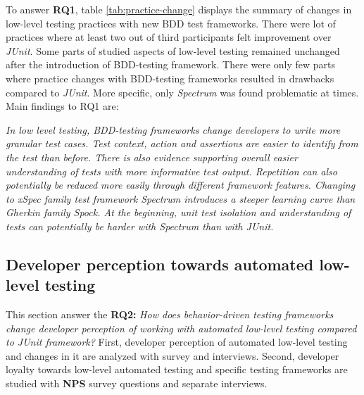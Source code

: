 To answer \textbf{RQ1}, table \ref{tab:practice-change} displays the summary of changes in low-level testing practices with new BDD test
frameworks. There were lot of practices where at least two out of third participants felt improvement over \textit{JUnit}.
Some parts of studied aspects of low-level testing remained unchanged after the introduction of BDD-testing framework.
There were only few parts where practice changes with BDD-testing frameworks resulted in drawbacks compared to \textit{JUnit}. More
specific, only \textit{Spectrum} was found problematic at times. Main findings to RQ1 are:

\vskip 1mm
\begin{topbot}
\textit{In low level testing, BDD-testing frameworks change developers to write more granular test cases. Test
context, action and assertions are easier to identify from the test than before. There is also evidence supporting
overall easier understanding of tests with more informative test output. Repetition can also potentially be reduced more easily through
different framework features.
\newline\newline Changing to xSpec family test framework Spectrum introduces a steeper learning curve than Gherkin family Spock.
At the beginning, unit test isolation and understanding of tests can potentially be harder with Spectrum than with JUnit.}
\end{topbot}

\clearpage


\subsection{Developer perception towards automated low-level testing}
This section answer the
\textbf{RQ2: }\textit{How does behavior-driven testing frameworks change developer perception of working with automated low-level
testing compared to \textit{JUnit} framework?} First, developer perception of automated low-level testing and changes in it are
analyzed with survey and interviews. Second, developer loyalty towards low-level automated testing and specific testing
frameworks are studied with \textbf{NPS} survey questions and separate interviews.

